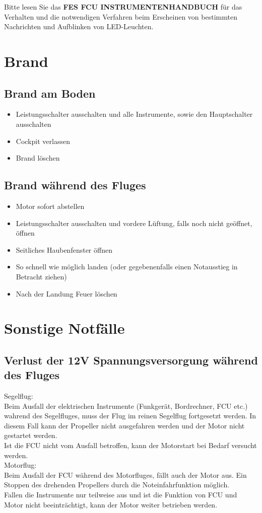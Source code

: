 Bitte lesen Sie das \textbf{FES FCU INSTRUMENTENHANDBUCH} für das Verhalten und die notwendigen Verfahren beim Erscheinen von bestimmten Nachrichten und Aufblinken von LED-Leuchten.

\section{Brand}
\subsection{Brand am Boden}

\begin{itemize}
\item Leistungsschalter ausschalten und alle Instrumente, sowie den Hauptschalter ausschalten
\item Cockpit verlassen
\item Brand löschen
\end{itemize}
\newpage
\subsection{Brand während des Fluges}
\begin{itemize}
\item Motor sofort abstellen
\item Leistungsschalter ausschalten und vordere Lüftung, falls noch nicht geöffnet, öffnen
\item Seitliches Haubenfenster öffnen
\item So schnell wie möglich landen (oder gegebenenfalls einen Notausstieg in Betracht ziehen)
\item Nach der Landung Feuer löschen
\end{itemize}

\section{Sonstige Notfälle}

\subsection{Verlust der 12V Spannungsversorgung während des Fluges}

Segelflug:\\
Beim Ausfall der elektrischen Instrumente (Funkgerät, Bordrechner, FCU etc.)
wahrend des Segelfluges, muss der Flug im reinen Segelflug fortgesetzt werden. In
diesem Fall kann der Propeller nicht ausgefahren werden und der Motor nicht gestartet werden.\\

Ist die FCU nicht vom Ausfall betroffen, kann der Motorstart bei Bedarf versucht werden.\\

Motorflug:\\
Beim Ausfall der FCU während des Motorfluges, fällt auch der Motor aus. Ein Stoppen des drehenden Propellers durch die Noteinfahrfunktion möglich.\\

Fallen die Instrumente nur teilweise aus und ist die Funktion von FCU und Motor nicht beeinträchtigt, kann der Motor weiter betrieben werden.

